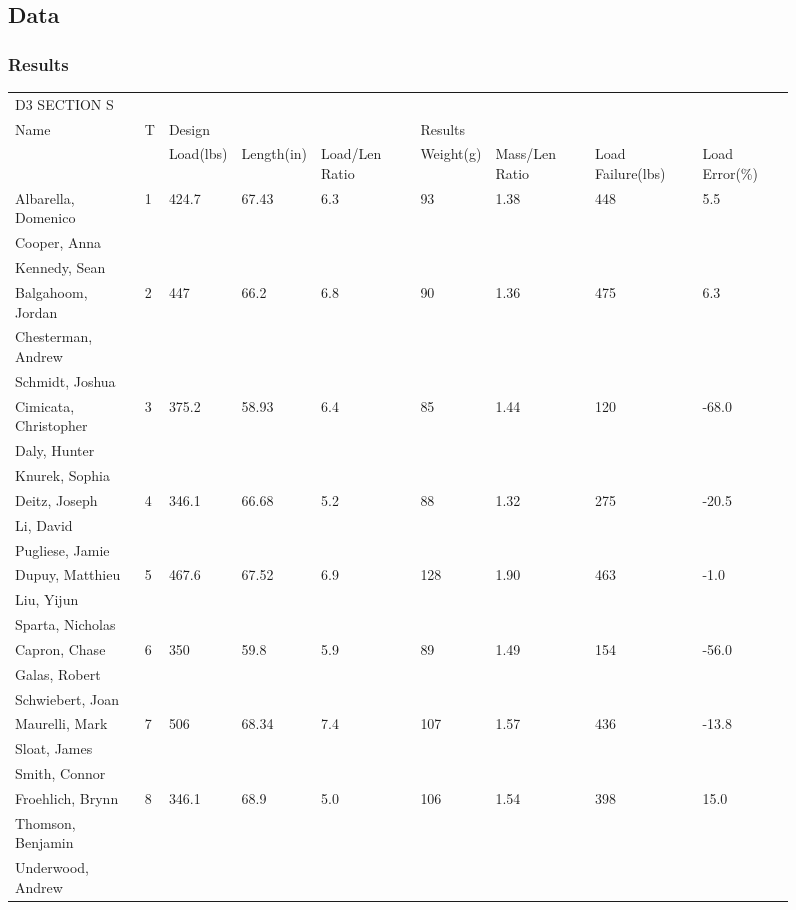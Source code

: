 \documentclass{article}
\let\Oldsubsection\subsection
\renewcommand{\subsection}{\FloatBarrier\Oldsubsection}
\let\Oldsubsubsection\subsubsection
\renewcommand{\subsubsection}{\FloatBarrier\Oldsubsubsection}
\begin{document}
\begin{figure}

\subsection{Data}

\bigskip

\subsubsection{Results}

\bigskip

\begin{tabular}{lllllllll}
D3 SECTION S &  &  &  &  &  &  &  &  \\
Name & T & Design &  &  & Results &  &  &  \\
 &  & Load(lbs) & Length(in) & Load/Len Ratio & Weight(g) & Mass/Len Ratio & Load Failure(lbs) & Load Error(\%) \\
Albarella, Domenico & 1 & 424.7 & 67.43 & 6.3 & 93 & 1.38 & 448 & 5.5 \\
Cooper, Anna &  &  &  &  &  &  &  &  \\
Kennedy, Sean &  &  &  &  &  &  &  &  \\
Balgahoom, Jordan & 2 & 447 & 66.2 & 6.8 & 90 & 1.36 & 475 & 6.3 \\
Chesterman, Andrew &  &  &  &  &  &  &  &  \\
Schmidt, Joshua &  &  &  &  &  &  &  &  \\
Cimicata, Christopher & 3 & 375.2 & 58.93 & 6.4 & 85 & 1.44 & 120 & -68.0 \\
Daly, Hunter &  &  &  &  &  &  &  &  \\
Knurek, Sophia &  &  &  &  &  &  &  &  \\
Deitz, Joseph & 4 & 346.1 & 66.68 & 5.2 & 88 & 1.32 & 275 & -20.5 \\
Li, David &  &  &  &  &  &  &  &  \\
Pugliese, Jamie &  &  &  &  &  &  &  &  \\
Dupuy, Matthieu & 5 & 467.6 & 67.52 & 6.9 & 128 & 1.90 & 463 & -1.0 \\
Liu, Yijun &  &  &  &  &  &  &  &  \\
Sparta, Nicholas &  &  &  &  &  &  &  &  \\
Capron, Chase & 6 & 350 & 59.8 & 5.9 & 89 & 1.49 & 154 & -56.0 \\
Galas, Robert &  &  &  &  &  &  &  &  \\
Schwiebert, Joan &  &  &  &  &  &  &  &  \\
Maurelli, Mark & 7 & 506 & 68.34 & 7.4 & 107 & 1.57 & 436 & -13.8 \\
Sloat, James &  &  &  &  &  &  &  &  \\
Smith, Connor &  &  &  &  &  &  &  &  \\
Froehlich, Brynn & 8 & 346.1 & 68.9 & 5.0 & 106 & 1.54 & 398 & 15.0 \\
Thomson, Benjamin &  &  &  &  &  &  &  &  \\
Underwood, Andrew &  &  &  &  &  &  &  & 
\end{tabular}

\end{figure}
\end{document}
